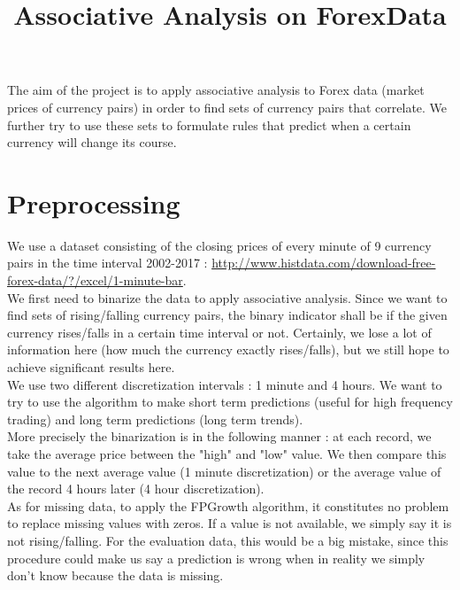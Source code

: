 \documentclass[paper=a4,fontsize=11pt,DIV=8,BCOR=5mm,twoside,pdftex]{scrartcl}
\title{Associative Analysis on ForexData}
\begin{document}
	\maketitle

	The aim of the project is to apply associative analysis to Forex data (market prices of currency pairs) in order to find sets of currency pairs that correlate. We further try to use these sets to formulate rules that predict when a certain currency will change its course.
	
	\section{Preprocessing}
	
	We use a dataset consisting of the closing prices of every minute of 9 currency pairs in the time interval 2002-2017 : \url{http://www.histdata.com/download-free-forex-data/?/excel/1-minute-bar}.\\
	
	We first need to binarize the data to apply associative analysis. Since we want to find sets of rising/falling currency pairs, the binary indicator shall be if the given currency rises/falls in a certain time interval or not. Certainly, we lose a lot of information here (how much the currency exactly rises/falls), but we still hope to achieve significant results here.\\

	We use two different discretization intervals : 1 minute and 4 hours. We want to try to use the algorithm to make short term predictions (useful for high frequency trading) and long term predictions (long term trends).\\
	
	More precisely the binarization is in the following manner : at each record, we take the average price between the "high" and "low" value. We then compare this value to the next average value (1 minute discretization) or the average value of the record 4 hours later (4 hour discretization).\\
	
	
	As for missing data, to apply the FPGrowth algorithm, it constitutes no problem to replace missing values with zeros. If a value is not available, we simply say it is not rising/falling. For the evaluation data, this would be a big mistake, since this procedure could make us say a prediction is wrong when in reality we simply don't know because the data is missing.\\
		
\end{document}
